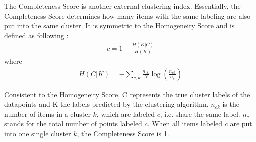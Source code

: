 The Completeness Score is another external clustering index. Essentially, the Completeness Score determines how many items with the same labeling are also put into the same cluster. It is symmetric to the Homogeneity Score and is defined as following \cite{rosenberg2007v}:
\begin{align}
    c = 1 - \frac{H(K|C)}{H(K)}  
\end{align}
where
\begin{align}
    H(C|K) = - \sum_{c,k} \frac{n_{ck}}{N}\log\left(\frac{n_{ck}}{n_c}\right)  
\end{align}


Consistent to the Homogeneity Score, C represents the true cluster labels of the datapoints and K the labels predicted by the clustering algorithm. $n_{ck}$ is the number of items in a cluster $k$, which are labeled $c$, i.e. share the same label. $n_c$ stands for the total number of points labeled $c$.
When all items labeled $c$ are put into one single cluster $k$, the Completeness Score is 1.